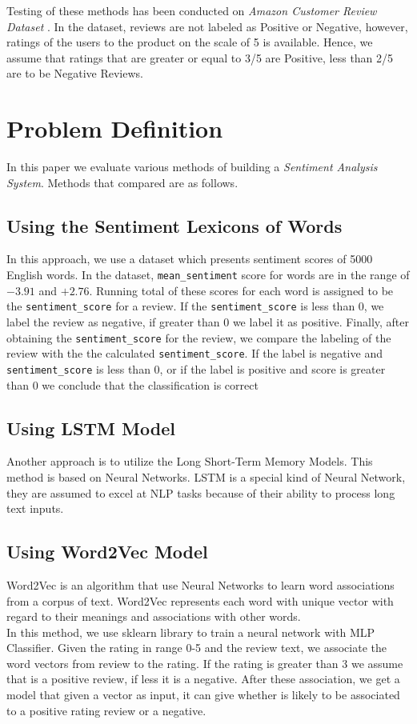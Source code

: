 \documentclass[11pt,a4paper]{article}
\begin{document}
 Testing of these methods has been conducted on \textit{Amazon Customer Review Dataset} \cite{He_2016, mcauley2015imagebased}. In the dataset, reviews are not labeled as Positive or Negative, however, ratings of the users to the product on the scale of 5 is available. Hence, we assume that ratings that are greater or equal to 3/5 are Positive, less than 2/5 are to be Negative Reviews.
 
\section{Problem Definition}
In this paper we evaluate various methods of building a \textit{Sentiment Analysis System}. Methods that compared are as follows.
\subsection{Using the Sentiment Lexicons of Words}
	In this approach, we use a dataset which presents sentiment scores of 5000 English words. In the dataset, \texttt{mean\_sentiment} score for words are in the range of $-3.91$ and $+2.76$. Running total of these scores for each word is assigned to be the \texttt{sentiment\_score} for a review. If the \texttt{sentiment\_score} is less than 0, we label the review as negative, if greater than 0 we label it as positive. Finally, after obtaining the \texttt{sentiment\_score} for the review, we compare the labeling of the review with the the calculated \texttt{sentiment\_score}. If the label is negative and \texttt{sentiment\_score} is less than 0, or if the label is positive and score is greater than 0 we conclude that the classification is correct 
\subsection{Using LSTM Model}
	Another approach is to utilize the Long Short-Term Memory Models. 	This method is based on Neural Networks. LSTM is a special kind of Neural Network, they are assumed to excel at NLP tasks because of their ability to process long text inputs.  

\subsection{Using Word2Vec Model}
Word2Vec is an algorithm that use Neural Networks to learn word associations from a corpus of text. Word2Vec represents each word with unique vector with regard to their meanings and associations with other words. \\
In this method, we use sklearn library to train a neural network with MLP Classifier. Given the rating in range 0-5 and the review text, we associate the word vectors from review to the rating. If the rating is greater than 3 we assume that is a positive review, if less it is a negative. After these association, we get a model that given a vector as input, it can give whether is likely to be associated to a positive rating review or a negative. 
\end{document}
